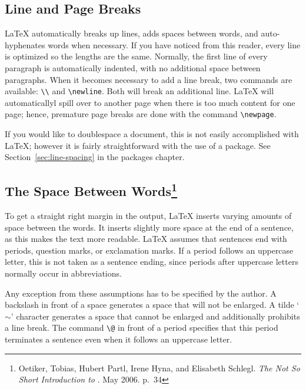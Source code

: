 \subsection{Line and Page Breaks}
\label{sec:line-page-breaks}

\LaTeX{} automatically breaks up lines, adds spaces between words, and
auto-hyphenates words when necessary.  If you have noticed from this
reader, every line is optimized so the lengths are the same.
Normally, the first line of every paragraph is automatically indented,
with no additional space between paragraphs.  When it becomes
necessary to add a line break, two commands are available: \verb=\\=
and \verb=\newline=.  Both will break an additional line.  \LaTeX{}
will automaticallyl spill over to another page when there is too much
content for one page; hence, premature page breaks are done with the
command \verb=\newpage=.

If you would like to doublespace a document, this is not easily
accomplished with \LaTeX{}; however it is fairly straightforward with
the use of a package.  See Section~\ref{sec:line-spacing} in the
packages chapter.
    
\subsection{The Space Between Words\protect\footnote{Oetiker, Tobias, Hubert Partl, Irene Hyna, and Elisabeth Schlegl.  \emph{The Not So Short Introduction to \LaTeXe{}}.  May 2006.  p.\ 34}}
\label{sec:space-betw-words}

To get a straight right margin in the output, \LaTeX{} inserts varying
amounts of space between the words.  It inserts slightly more space at
the end of a sentence, as this makes the text more readable.  \LaTeX{}
assumes that sentences end with periods, question marks, or
exclamation marks.  If a period follows an uppercase letter, this is
not taken as a sentence ending, since periods after uppercase letters
normally occur in abbreviations.

Any exception from these assumptions has to be specified by the
author.  A backslash in front of a space generates a space that will
not be enlarged.  A tilde `$\sim$' character generates a space that
cannot be enlarged and additionally prohibits a line break.  The
command \verb=\@= in front of a period specifies that this period
terminates a sentence even when it follows an uppercase letter.

